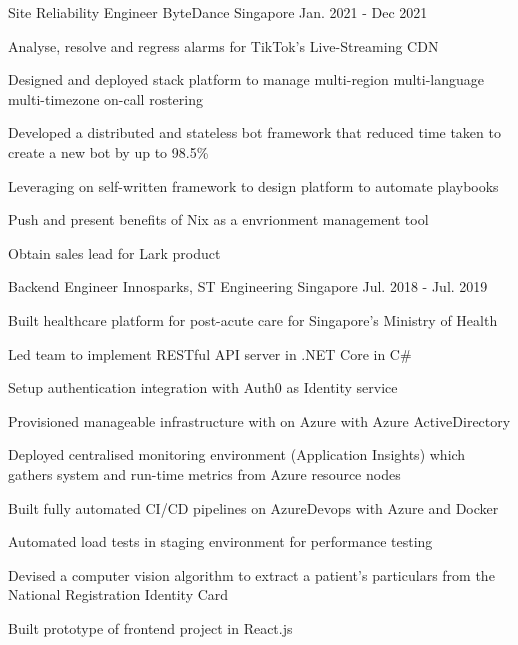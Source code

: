 \begin{cventries}
    \cventry
    {Site Reliability Engineer} %
    {ByteDance} %
    {Singapore} %
    {Jan. 2021 - Dec 2021} %
    {
    \begin{cvitems} %
        \item {Analyse, resolve and regress alarms for TikTok's Live-Streaming CDN}
        \item {Designed and deployed stack platform to manage multi-region multi-language multi-timezone on-call rostering}
        \item {Developed a distributed and stateless bot framework that reduced time taken to create a new bot by up to 98.5\%}
        \item {Leveraging on self-written framework to design platform to automate playbooks}
        \item {Push and present benefits of Nix as a envrionment management tool}
        \item {Obtain sales lead for Lark product}
    \end{cvitems}
    }

    \cventry
    {Backend Engineer} %
    {Innosparks, ST Engineering} %
    {Singapore} %
    {Jul. 2018 - Jul. 2019} %
    {
    \begin{cvitems} %
        \item {Built healthcare platform for post-acute care for Singapore's Ministry of Health }
        \item {Led team to implement RESTful API server in .NET Core in C\# }
        \item {Setup authentication integration with Auth0 as Identity service}
        \item {Provisioned manageable infrastructure with on Azure with Azure ActiveDirectory}
        \item {Deployed centralised monitoring environment (Application Insights) which gathers system and run-time metrics from Azure resource nodes}
        \item {Built fully automated CI/CD pipelines on AzureDevops with Azure and Docker}
        \item {Automated load tests in staging environment for performance testing}
        \item {Devised a computer vision algorithm to extract a patient's particulars from the National Registration Identity Card}
        \item {Built prototype of frontend project in React.js}
    \end{cvitems}
    }

   
\end{cventries}
